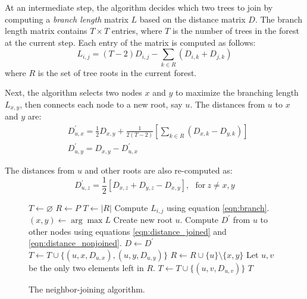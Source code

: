 \documentclass[11pt,letterpaper]{article}
\let\oldReturn\Return
\renewcommand{\Return}{\State\oldReturn}
\theoremstyle{definition}
\begin{document}
At an intermediate step, the algorithm decides which two trees to join by computing a \textit{branch length} matrix $L$ based on the distance matrix $D$. The branch length matrix contains $T \times T$ entries, where $T$ is the number of trees in the forest at the current step. Each entry of the matrix is computed as follows:  
\begin{equation}
  L_{i, j} = (T - 2) D_{i, j} - \sum_{k \in R} (D_{i, k} + D_{j, k})
  \label{eqn:branch}
\end{equation} where $R$ is the set of tree roots in the current forest.

Next, the algorithm selects two nodes $x$ and $y$ to maximize the branching length $L_{x, y}$, then connects each node to a new root, say $u$. The distances from $u$ to $x$ and $y$ are:  
\begin{equation}
\begin{split}
  & D_{u, x}^{'} = \frac{1}{2} D_{x, y} + \frac{1}{2(T - 2)} \left[ \sum_{k \in R} (D_{x, k} - D_{y, k}) \right] 
\\  
& D_{u, y}^{'} = D_{x, y} - D_{u, x}^{'}
\end{split}
\label{eqn:distance_joined}
\end{equation}

The distances from $u$ and other roots are also re-computed as:
\begin{equation}
  D_{u, z}^{'} = \frac{1}{2} \left[ D_{x, z} + D_{y, z} - D_{x, y} \right], \ \ \ \text{for} \ z \neq x, y
\label{eqn:distance_nonjoined}
\end{equation}

\begin{figure}[t]
  \begin{algorithmic}[1]
      \State $T \leftarrow \varnothing$ 
      \State $R \leftarrow P$
        \State $T \leftarrow |R|$
          \State Compute $L_{i, j}$ using equation \ref{eqn:branch}. 
        \EndFor
        \State $(x, y) \leftarrow \arg \max L$
        \State Create new root $u$.
        \State Compute $D^{'}$ from $u$ to other nodes using equations \ref{eqn:distance_joined} and \ref{eqn:distance_nonjoined}.
        \State $D \leftarrow D^{'}$
        \State $T \leftarrow T \cup \{(u, x, D_{u, x}), (u, y, D_{u, y})\}$
        \State $R \leftarrow R \cup \{u\} \setminus \{x, y\}$
      \EndFor
    \State Let $u, v$ be the only two elements left in $R$.
    \State $T \leftarrow T \cup \{(u, v, D_{u, v})\}$
    \Return $T$
   \EndFunction
  \end{algorithmic}
  \caption{\label{alg:nj}The neighbor-joining algorithm.}
\end{figure}
\end{document}
